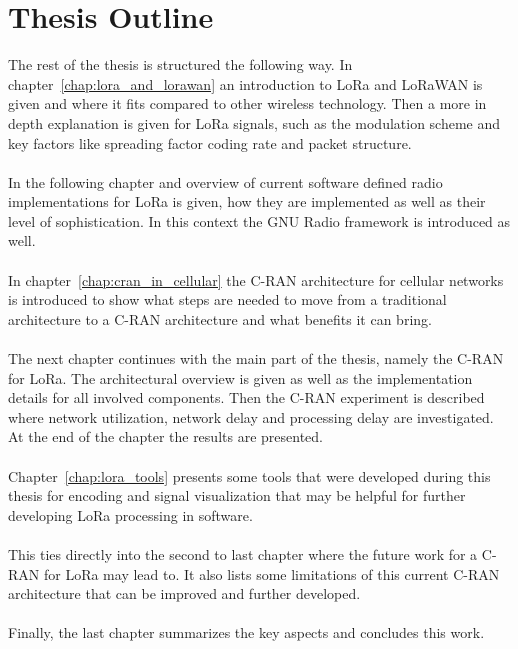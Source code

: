\section{Thesis Outline}
The rest of the thesis is structured the following way.
In chapter~\ref{chap:lora_and_lorawan} an introduction to LoRa and 
LoRaWAN is given and where it fits compared to other wireless technology. 
Then a more in depth explanation is given for LoRa signals, such as the modulation scheme and key 
factors like spreading factor coding rate and packet structure.
\\
\\
In the following chapter and overview of current software defined radio implementations for LoRa is given,
how they are implemented as well as their level of sophistication. In this context the GNU Radio 
framework is introduced as well.
\\
\\
In chapter~\ref{chap:cran_in_cellular} the C-RAN architecture for cellular networks 
is introduced to show what steps are needed to move from a traditional architecture to a C-RAN architecture
and what benefits it can bring. 
\\
\\
The next chapter continues with the main part of the thesis, namely the C-RAN for LoRa. 
The architectural overview is given as well as the implementation details for all 
involved components. Then the C-RAN experiment is described where 
network utilization, network delay and processing delay are investigated.
At the end of the chapter the results are presented.
\\
\\
Chapter~\ref{chap:lora_tools} presents some tools that were developed 
during this thesis for encoding and signal visualization that may be helpful
for further developing LoRa processing in software.
\\
\\
This ties directly into the second to last chapter where the future work 
for a C-RAN for LoRa may lead to. It also lists some limitations of this current 
C-RAN architecture that can be improved and further developed.
\\
\\
Finally, the last chapter summarizes the key aspects and concludes this work.


